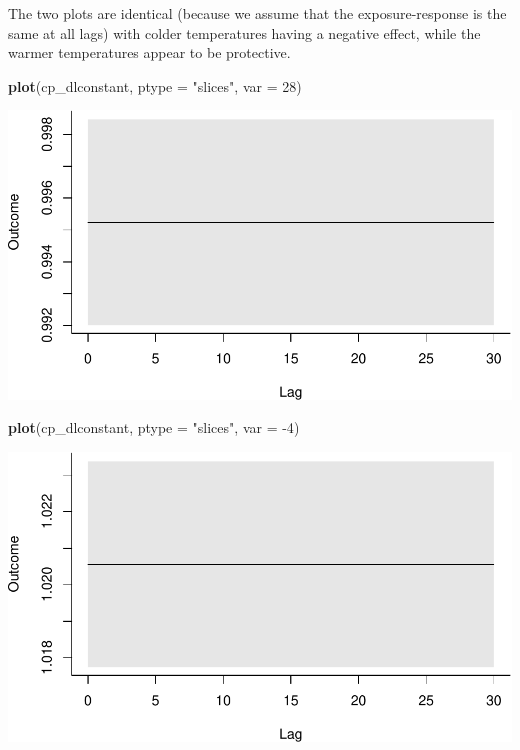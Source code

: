 \documentclass[
]{book}
\newenvironment{Shaded}{\begin{snugshade}}{\end{snugshade}}
\newcommand{\DataTypeTok}[1]{\textcolor[rgb]{0.13,0.29,0.53}{#1}}
\newcommand{\DecValTok}[1]{\textcolor[rgb]{0.00,0.00,0.81}{#1}}
\newcommand{\KeywordTok}[1]{\textcolor[rgb]{0.13,0.29,0.53}{\textbf{#1}}}
\newcommand{\NormalTok}[1]{#1}
\newcommand{\StringTok}[1]{\textcolor[rgb]{0.31,0.60,0.02}{#1}}
\begin{document}
The two plots are identical (because we assume that the exposure-response is the same at all lags) with colder temperatures having a negative effect, while the warmer temperatures appear to be protective.

\begin{Shaded}
\begin{Highlighting}[]
\KeywordTok{plot}\NormalTok{(cp_dlconstant, }\DataTypeTok{ptype =} \StringTok{"slices"}\NormalTok{, }\DataTypeTok{var =} \DecValTok{28}\NormalTok{)}
\end{Highlighting}
\end{Shaded}

\includegraphics{adv_epi_analysis_files/figure-latex/unnamed-chunk-112-1.pdf}

\begin{Shaded}
\begin{Highlighting}[]
\KeywordTok{plot}\NormalTok{(cp_dlconstant, }\DataTypeTok{ptype =} \StringTok{"slices"}\NormalTok{, }\DataTypeTok{var =} \DecValTok{-4}\NormalTok{)}
\end{Highlighting}
\end{Shaded}

\includegraphics{adv_epi_analysis_files/figure-latex/unnamed-chunk-112-2.pdf}
\end{document}
